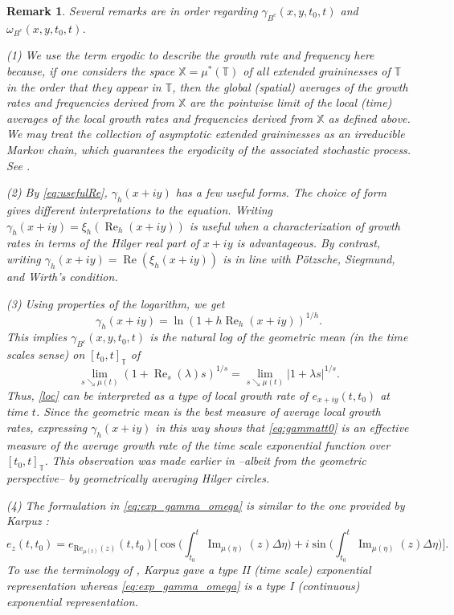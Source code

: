 \documentclass[10pt,a4paper]{amsart}
\DeclareMathOperator{\myRe}{Re}
\numberwithin{equation}{section}
\newtheorem{remark}[theorem]{Remark}
\begin{document}
\begin{remark} \rm
Several remarks are in order regarding $\gamma_{B^c}(x,y,t_0,t)$ and
$\omega_{B^c}(x,y,t_0,t)$.

(1) We use the term \emph{ergodic} to describe the growth rate and frequency here
because, if one considers the space $\mathbb{X}=\mu^*(\mathbb{T})$ of all extended graininesses
of $\mathbb{T}$ \cite{JaDaE} in the order that they appear in $\mathbb{T}$, then the global (spatial)
averages of the growth rates and frequencies derived from $\mathbb{X}$ are the
pointwise limit of the local (time) averages of the local growth rates and frequencies
derived from $\mathbb{X}$ as defined above. We may treat the collection of asymptotic
extended graininesses as an irreducible Markov chain, which guarantees the ergodicity
of the associated stochastic process. See \cite{PoDaGr}.

(2) By \eqref{eq:usefulRe}, $\gamma_{h}(x+iy)$ has a few useful forms. The choice of
form gives different interpretations to the equation. Writing
$\gamma_{h}(x+iy) = \xi_{h}(\myRe_{h}(x+iy))$ is useful when a characterization of
growth rates in terms of the Hilger real part of $x+iy$ is advantageous.
By contrast, writing $\gamma_{h}(x+iy) = \myRe(\xi_{h}(x+iy))$ is in line with
P\"otzsche, Siegmund, and Wirth's condition.

(3) Using properties of the logarithm, we get
$$
\gamma_{h}(x+iy) = \ln(1+h \myRe_{h}(x+iy))^{1/h}.
$$
This implies $\gamma_{B^c}(x,y,t_0,t)$ is the natural log of the geometric mean (in
the time scales sense) on $[t_0,t]_\mathbb{T}$ of
\begin{equation}\label{loc}
 \lim_{s \searrow\mu(t)}(1+\operatorname{Re}_{s}(\lambda) s)^{1/s}
 = \lim_{s \searrow\mu(t)}|1+\lambda s|^{1/s}.
\end{equation}
Thus, \eqref{loc} can be interpreted as a type of local growth rate of $e_{x+iy}(t,t_0)$
at time $t$. Since the geometric mean is the best measure of average local growth rates,
expressing $\gamma_{h}(x+iy)$ in this way shows that \eqref{eq:gammatt0} is an effective
 measure of the average growth rate of the time scale exponential function over
$[t_0,t]_{\mathbb{T}}$. This observation was made earlier in \cite{DaGrMaJa,JaDaE} --albeit
from the geometric perspective-- by geometrically averaging Hilger circles.

(4) The formulation in \eqref{eq:exp_gamma_omega} is similar to the one provided by
 Karpuz \cite{Ka}:
 \[%
 e_{z}(t,t_0) = e_{\text{Re}_{\mu(t)}(z)}(t,t_0)
 \Big[ \cos\Big(\int_{t_0}^{t} \operatorname{Im}_{\mu(\eta)}(z) \Delta \eta\Big)
 + i \sin\Big(\int_{t_0}^{t} \operatorname{Im}_{\mu(\eta)}(z) \Delta \eta\Big) \Big].
 \]
To use the terminology of \cite{JaDalap}, Karpuz gave a type II (time scale)
exponential representation whereas \eqref{eq:exp_gamma_omega} is a type I (continuous)
exponential representation.


\end{remark}
\end{document}
